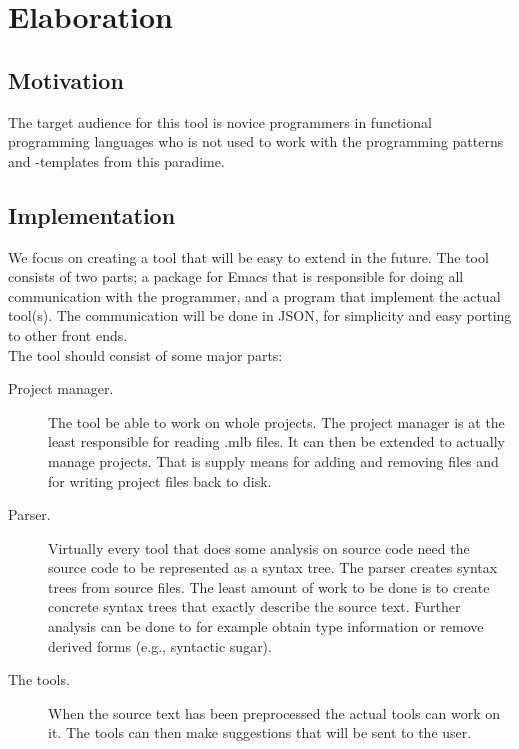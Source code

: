 \documentclass[a4paper,oneside]{memoir}
\begin{document}
\section{Elaboration}

\subsection{Motivation}

The target audience for this tool is novice programmers in functional
programming languages who is not used to work with the programming patterns
and -templates from this paradime. 




\subsection{Implementation}
We focus on creating a tool that will be easy to extend in the future. The tool consists of two
parts; a package for Emacs that is responsible for doing all communication with the programmer, and
a program that implement the actual tool(s). The communication will be done in JSON, for simplicity
and easy porting to other front ends.\\

The tool should consist of some major parts:
\begin{description}
\item[Project manager.] The tool be able to work on whole projects. The project manager is at the
least responsible for reading .mlb files. It can then be extended to actually manage projects. That
is supply means for adding and removing files and for writing project files back to disk.
\item[Parser.] Virtually every tool that does some analysis on source code need the source code to
be represented as a syntax tree. The parser creates syntax trees from source files. The least amount
of work to be done is to create concrete syntax trees that exactly describe the source text. Further
analysis can be done to for example obtain type information or remove derived forms (e.g., syntactic
sugar).
\item[The tools.] When the source text has been preprocessed the actual tools can work on it. The
tools can then make suggestions that will be sent to the user.
\end{description}
\end{document}
